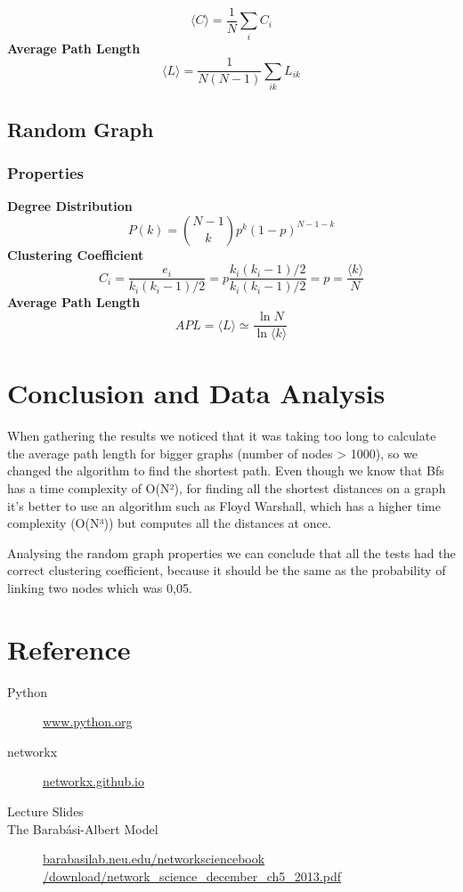 \documentclass[a4paper,titlepage,11pt]{article}
\begin{document}
\[
  \langle C\rangle = \frac{1}{N}\sum_{i}{C_i}
\]
\textbf{Average Path Length}
\[
  \langle L\rangle = \frac{1}{N(N-1)}\sum_{ik}{L_{ik}}
\]

\subsection{Random Graph}


\subsubsection{Properties}
\textbf{Degree Distribution}
\[
  P(k) = {{N-1}\choose{k}} p^{k}(1-p)^{N-1-k}
\]
\textbf{Clustering Coefficient}
\[
  C_i = \frac{e_i}{k_i(k_i-1)/2} = p \frac{k_i(k_i-1)/2}{k_i(k_i-1)/2} = p = \frac{\langle k\rangle}{N}
\]
\textbf{Average Path Length}
\[
  APL = \langle L\rangle \simeq \frac{\ln{N}}{\ln{\langle k\rangle}}
\]

\section{Conclusion and Data Analysis}
When gathering the results we noticed that it was taking too long to calculate the average path length for bigger graphs (number of nodes > 1000), so we changed the algorithm to find the shortest path. Even though we know that Bfs has a time complexity of O(N²), for finding all the shortest distances on a graph it's better to use an algorithm such as Floyd Warshall, which has a higher time complexity (O(N³)) but computes all the distances at once.

Analysing the random graph properties we can conclude that all the tests had the correct clustering coefficient, because it should be the same as the probability of linking two nodes which was 0,05.

\section{Reference}
\begin{description}
  \item[Python] \href{https://www.python.org}{www.python.org}
  \item[networkx] \href{https://networkx.github.io}{networkx.github.io}
  \item[Lecture Slides]
  \item[The Barabási-Albert Model] \href{http://barabasilab.neu.edu/networksciencebook/download/network_science_december_ch5_2013.pdf}{barabasilab.neu.edu/networksciencebook\\/download/network\_science\_december\_ch5\_2013.pdf}
\end{description}
\end{document}
